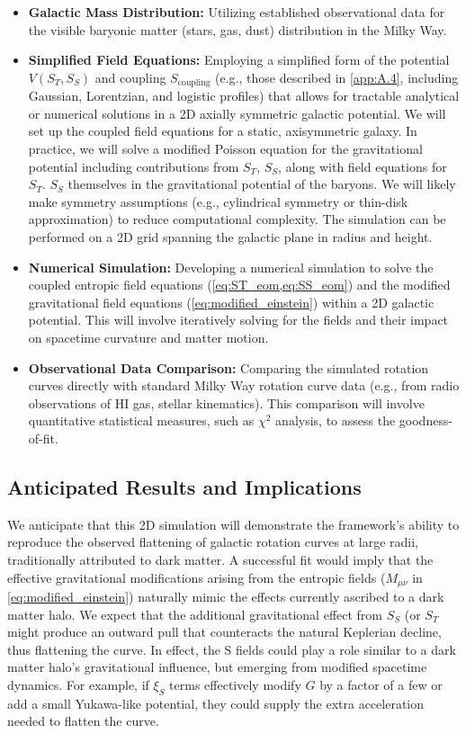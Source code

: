 \documentclass[11pt,a4paper]{article} %
\newcommand{\ST}{S_T}
\newcommand{\SSp}{S_S} %
\newcommand{\Scoupling}{S_{\text{coupling}}}
\newcommand{\Mmu}{M} %
\begin{document}
\begin{itemize}
    \item \textbf{Galactic Mass Distribution:} Utilizing established observational data for the visible baryonic matter (stars, gas, dust) distribution in the Milky Way.
    \item \textbf{Simplified Field Equations:} Employing a simplified form of the potential $V(\ST,\SSp)$ and coupling $\Scoupling$ (e.g., those described in \cref{app:A.4}, including Gaussian, Lorentzian, and logistic profiles) that allows for tractable analytical or numerical solutions in a 2D axially symmetric galactic potential. We will set up the coupled field equations for a static, axisymmetric galaxy. In practice, we will solve a modified Poisson equation for the gravitational potential including contributions from $\ST$, $\SSp$, along with field equations for $\ST$. $\SSp$ themselves in the gravitational potential of the baryons. We will likely make symmetry assumptions (e.g., cylindrical symmetry or thin-disk approximation) to reduce computational complexity. The simulation can be performed on a 2D grid spanning the galactic plane in radius and height.
    \item \textbf{Numerical Simulation:} Developing a numerical simulation to solve the coupled entropic field equations (\cref{eq:ST_eom,eq:SS_eom}) and the modified gravitational field equations (\cref{eq:modified_einstein}) within a 2D galactic potential. This will involve iteratively solving for the fields and their impact on spacetime curvature and matter motion.
    \item \textbf{Observational Data Comparison:} Comparing the simulated rotation curves directly with standard Milky Way rotation curve data (e.g., from radio observations of HI gas, stellar kinematics). This comparison will involve quantitative statistical measures, such as $\chi^2$ analysis, to assess the goodness-of-fit.
\end{itemize}

\subsection{Anticipated Results and Implications}
We anticipate that this 2D simulation will demonstrate the framework's ability to reproduce the observed flattening of galactic rotation curves at large radii, traditionally attributed to dark matter. A successful fit would imply that the effective gravitational modifications arising from the entropic fields ($\Mmu_{\mu\nu}$ in \cref{eq:modified_einstein}) naturally mimic the effects currently ascribed to a dark matter halo. We expect that the additional gravitational effect from $\SSp$ (or $\ST$ might produce an outward pull that counteracts the natural Keplerian decline, thus flattening the curve. In effect, the S fields could play a role similar to a dark matter halo's gravitational influence, but emerging from modified spacetime dynamics. For example, if $\xi_S$ terms effectively modify $G$ by a factor of a few or add a small Yukawa-like potential, they could supply the extra acceleration needed to flatten the curve.
\end{document}
